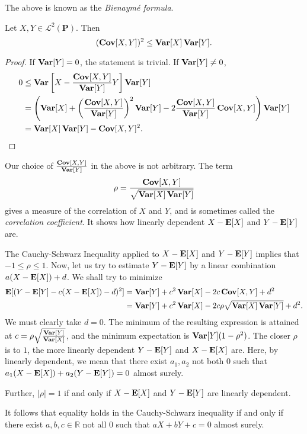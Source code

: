 The above is known as the \textit{Bienaym\'{e} formula}.

\begin{ftheo}
    Let $X,Y\in\mathcal{L}^2(\textbf{P})$. Then
    $$(\operatorname{\textbf{Cov}}[X,Y])^2\leq \operatorname{\textbf{Var}}[X]\operatorname{\textbf{Var}}[Y].$$
\end{ftheo}
\begin{proof}
    If $\operatorname{\textbf{Var}}[Y]=0$, the statement is trivial. If $\operatorname{\textbf{Var}}[Y]\neq 0$,
    \begin{align*}
        0 &\leq \operatorname{\textbf{Var}}\left[X - \frac{\operatorname{\textbf{Cov}}[X,Y]}{\operatorname{\textbf{Var}}[Y]}Y\right]\operatorname{\textbf{Var}}[Y] \\
        &= \left(\operatorname{\textbf{Var}}[X] + \left(\frac{\operatorname{\textbf{Cov}}[X,Y]}{\operatorname{\textbf{Var}}[Y]}\right)^2\operatorname{\textbf{Var}}[Y] - 2\frac{\operatorname{\textbf{Cov}}[X,Y]}{\operatorname{\textbf{Var}}[Y]}\operatorname{\textbf{Cov}}[X,Y]\right)\operatorname{\textbf{Var}}[Y] \\
        &= \operatorname{\textbf{Var}}[X]\operatorname{\textbf{Var}}[Y] - \operatorname{\textbf{Cov}}[X,Y]^2.
    \end{align*}
\end{proof}

Our choice of $\frac{\operatorname{\textbf{Cov}}[X,Y]}{\operatorname{\textbf{Var}}[Y]}$ in the above is not arbitrary. The term
$$\rho=\frac{\operatorname{\textbf{Cov}}[X,Y]}{\sqrt{\operatorname{\textbf{Var}}[X]\operatorname{\textbf{Var}}[Y]}}$$
gives a measure of the correlation of $X$ and $Y$, and is sometimes called the \textit{correlation coefficient}. It shows how linearly dependent $X-\textbf{E}[X]$ and $Y-\textbf{E}[Y]$ are.

The Cauchy-Schwarz Inequality applied to $X-\textbf{E}[X]$ and $Y-\textbf{E}[Y]$ implies that $-1\leq\rho\leq 1$. Now, let us try to estimate $Y-\textbf{E}[Y]$ by a linear combination $a(X-\textbf{E}[X])+d$. We shall try to minimize
\begin{align*}
    \textbf{E}[(Y-\textbf{E}[Y]-c(X-\textbf{E}[X])-d)^2] &= \operatorname{\textbf{Var}}[Y] + c^2\operatorname{\textbf{Var}}[X]-2c\operatorname{\textbf{Cov}}[X,Y]+d^2 \\
    &= \operatorname{\textbf{Var}}[Y] + c^2\operatorname{\textbf{Var}}[X]-2c\rho\sqrt{\operatorname{\textbf{Var}}[X]\operatorname{\textbf{Var}}[Y]}+d^2.
\end{align*}
We must clearly take $d=0$. The minimum of the resulting expression is attained at $c=\rho\sqrt{\frac{\operatorname{\textbf{Var}}[Y]}{\operatorname{\textbf{Var}}[X]}}$, and the minimum expectation is $\operatorname{\textbf{Var}}[Y](1-\rho^2)$. The closer $\rho$ is to $1$, the more linearly dependent $Y-\textbf{E}[Y]$ and $X-\textbf{E}[X]$ are. Here, by linearly dependent, we mean that there exist $a_1,a_2$ not both $0$ such that $a_1(X-\textbf{E}[X])+a_2(Y-\textbf{E}[Y])=0$ almost surely.

Further, $|\rho|=1$ if and only if $X-\textbf{E}[X]$ and $Y-\textbf{E}[Y]$ are linearly dependent.

\vspace{1mm}
It follows that equality holds in the Cauchy-Schwarz inequality if and only if there exist $a,b,c\in\mathbb{R}$ not all $0$ such that $aX+bY+c=0$ almost surely.

